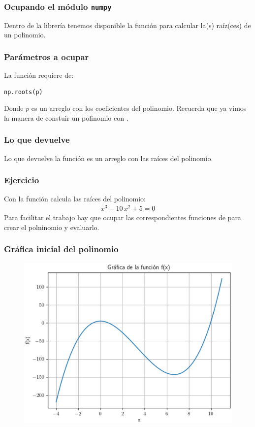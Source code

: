\documentclass[12pt]{beamer}
\begin{document}
\begin{frame}
\frametitle{Ocupando el módulo \texttt{numpy}}
Dentro de la librería  tenemos disponible la función  para calcular la(s) raíz(ces) de \textcolor{armygreen}{un polinomio}.
\end{frame}
\begin{frame}[fragile]
\frametitle{Parámetros a ocupar}
La función  requiere de:
\begin{verbatim}
np.roots(p)
\end{verbatim}
Donde $p$ es un arreglo con los coeficientes del polinomio. \pause Recuerda que ya vimos la manera de constuir un polinomio con .
\end{frame}
\begin{frame}
\frametitle{Lo que devuelve}
Lo que devuelve la función  es un arreglo con las raíces del polinomio.
\end{frame}
\begin{frame}
\frametitle{Ejercicio}
Con la función  calcula las raíces del polinomio:
\pause
\begin{align*}
x^{3} - 10 \, x^{2} + 5 = 0
\end{align*}
Para facilitar el trabajo hay que ocupar las correspondientes funciones de  para crear el polninomio y evaluarlo.
\end{frame}
\begin{frame}
\frametitle{Gráfica inicial del polinomio}
\begin{figure}
    \centering
    \includegraphics[scale=0.55]{Imagenes/raices_numpy_roots_01.eps}
\end{figure}
\end{frame}
\end{document}

